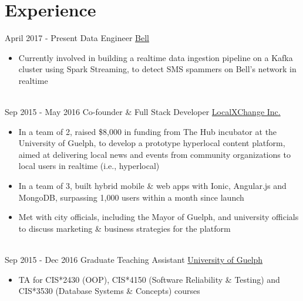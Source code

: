 \documentclass[letterpaper]{twentysecondcv} %
\begin{document}

\section{Experience}

\begin{twenty} %
\twentyitem
    	{April 2017 -}
		{Present}
        {Data Engineer}
        {\href{http://www.bell.ca/}{Bell}}
        {}
        {\begin{itemize}
        \item Currently involved in building a realtime data ingestion pipeline on a Kafka cluster using Spark Streaming, to detect SMS spammers on Bell's network in realtime
        \end{itemize}}
        \\
	\twentyitem
    	{Sep 2015 -}
		{May 2016}
        {Co-founder \& Full Stack Developer}
        {\href{http://www.localxchange.ca/}{LocalXChange Inc.}}
        {}
        {
        {\begin{itemize}
        \item In a team of 2, raised \$8,000 in funding from The Hub incubator at the University of Guelph, to develop a prototype hyperlocal content platform, aimed at delivering local news and events from community organizations to local users in realtime (i.e., hyperlocal)
        \item In a team of 3, built hybrid mobile \& web apps with Ionic, Angular.js and MongoDB, surpassing 1,000 users within a month since launch
        \item Met with city officials, including the Mayor of Guelph, and university officials to discuss marketing \& business strategies for the platform 
    \end{itemize}}
        }
    \\   
    \twentyitem
   		{Sep 2015 -}
		{Dec 2016}
        {Graduate Teaching Assistant}
        {\href{http://www.uoguelph.ca}{University of Guelph}}
        {}
        {
        {\begin{itemize}
        \item TA for CIS*2430 (OOP), CIS*4150 (Software Reliability \& Testing) and CIS*3530 (Database Systems \& Concepts) courses
    \end{itemize}}
        }

\end{twenty}
\end{document}
